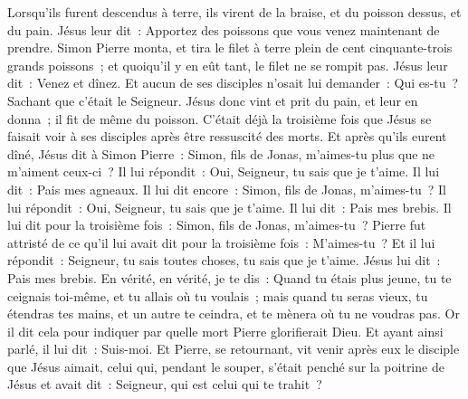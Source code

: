 \begin{multicols}{2}
Lorsqu'ils furent descendus à terre, ils virent de la braise, et du poisson dessus, et du pain.
Jésus leur dit~: Apportez des poissons que vous venez maintenant de prendre.
Simon Pierre monta, et tira le filet à terre plein de cent cinquante-trois grands poissons~; et quoiqu'il y en eût tant, le filet ne se rompit pas.
Jésus leur dit~: Venez et dînez. Et aucun de ses disciples n'osait lui demander~: Qui es-tu~? Sachant que c'était le Seigneur.
Jésus donc vint et prit du pain, et leur en donna~; il fit de même du poisson.
C'était déjà la troisième fois que Jésus se faisait voir à ses disciples après être ressuscité des morts.
Et après qu'ils eurent dîné, Jésus dit à Simon Pierre~: Simon, fils de Jonas, m'aimes-tu plus que ne m'aiment ceux-ci~? Il lui répondit~: Oui, Seigneur, tu sais que je t'aime. Il lui dit~: Pais mes agneaux.
Il lui dit encore~: Simon, fils de Jonas, m'aimes-tu~? Il lui répondit~: Oui, Seigneur, tu sais que je t'aime. Il lui dit~: Pais mes brebis.
Il lui dit pour la troisième fois~: Simon, fils de Jonas, m'aimes-tu~? Pierre fut attristé de ce qu'il lui avait dit pour la troisième fois~: M'aimes-tu~? Et il lui répondit~: Seigneur, tu sais toutes choses, tu sais que je t'aime. Jésus lui dit~: Pais mes brebis.
En vérité, en vérité, je te dis~: Quand tu étais plus jeune, tu te ceignais toi-même, et tu allais où tu voulais~; mais quand tu seras vieux, tu étendras tes mains, et un autre te ceindra, et te mènera où tu ne voudras pas.
Or il dit cela pour indiquer par quelle mort Pierre glorifierait Dieu. Et ayant ainsi parlé, il lui dit~: Suis-moi.
Et Pierre, se retournant, vit venir après eux le disciple que Jésus aimait, celui qui, pendant le souper, s'était penché sur la poitrine de Jésus et avait dit~: Seigneur, qui est celui qui te trahit~?

\end{multicols}
